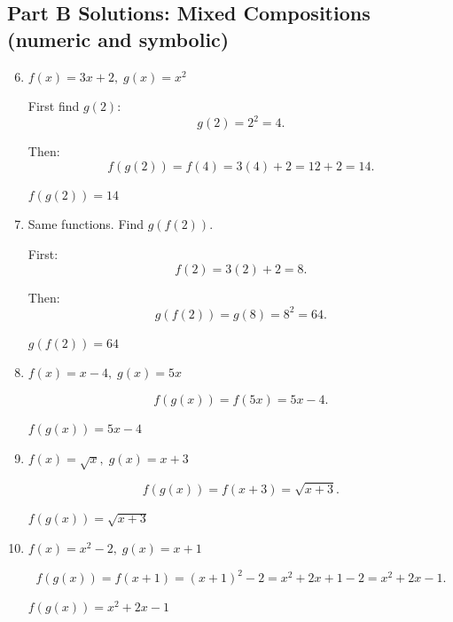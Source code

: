 \documentclass[14pt]{extarticle}
\begin{document}
\subsection*{Part B Solutions: Mixed Compositions (numeric and symbolic)}
\begin{enumerate}
  \setcounter{enumi}{5}
  \item \(f(x) = 3x + 2,\; g(x) = x^2\)

  First find \(g(2)\):
  \[
  g(2) = 2^2 = 4.
  \]

  Then:
  \[
  f(g(2)) = f(4) = 3(4) + 2 = 12 + 2 = 14.
  \]

  \(\boxed{f(g(2)) = 14}\)

  \item Same functions. Find \(g(f(2))\).

  First:
  \[
  f(2) = 3(2) + 2 = 8.
  \]

  Then:
  \[
  g(f(2)) = g(8) = 8^2 = 64.
  \]

  \(\boxed{g(f(2)) = 64}\)

  \item \(f(x) = x - 4,\; g(x) = 5x\)

  \[
  f(g(x)) = f(5x) = 5x - 4.
  \]

  \(\boxed{f(g(x)) = 5x - 4}\)

  \item \(f(x) = \sqrt{x},\; g(x) = x + 3\)

  \[
  f(g(x)) = f(x + 3) = \sqrt{x + 3}.
  \]

  \(\boxed{f(g(x)) = \sqrt{x + 3}}\)

  \item \(f(x) = x^2 - 2,\; g(x) = x + 1\)

  \[
  f(g(x)) = f(x + 1) = (x + 1)^2 - 2 = x^2 + 2x + 1 - 2 = x^2 + 2x - 1.
  \]

  \(\boxed{f(g(x)) = x^2 + 2x - 1}\)
\end{enumerate}
\end{document}
